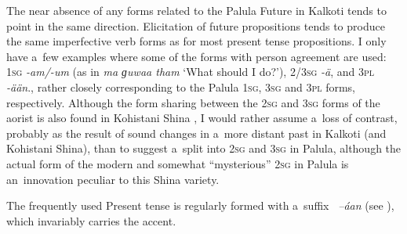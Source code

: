 The near absence of any forms related to the Palula Future in Kalkoti tends to point in the same direction. Elicitation of future propositions tends to produce the same imperfective verb forms as for most present tense propositions. I only have a~few examples where some of the forms with person agreement are used: \textsc{1sg} \textit{-am/-um} (as in \textit{ma ɡuwaa tham} `What should I do?'), \textsc{2/3sg} \textit{-ä}, and \textsc{3pl} \textit{-ään}., rather closely corresponding to the Palula \textsc{1sg}, \textsc{3sg} and \textsc{3pl} forms, respectively. Although the form sharing between the \textsc{2sg} and \textsc{3sg} forms of the aorist is also found in Kohistani Shina \citep[39]{schmidt2002}, I would rather assume a~loss of contrast, probably as the result of sound changes in a~more distant past in Kalkoti (and Kohistani Shina), than to suggest a~split into \textsc{2sg} and \textsc{3sg} in Palula, although the actual form of the modern and somewhat ``mysterious'' \textsc{2sg} in Palula is an~innovation peculiar to this Shina variety.


 The frequently used Present tense is regularly formed with a~suffix
\textit{~--áan} (see ), which invariably carries the accent.



